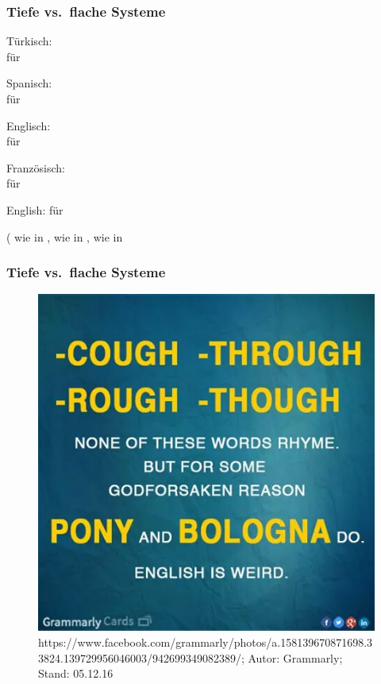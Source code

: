 \begin{frame}
\frametitle{Tiefe vs.\ flache Systeme}


	\ea Türkisch: \\
	 für \textipa{[dYkkan]}
	
	\ex Spanisch: \\
	 für \textipa{[negoTio]}
	
	\ex Englisch: \\
	 für \textipa{[bIzn@z]}
	
	\ex Französisch: \\
	 für \textipa{[butik]}
	\z 
	
\pause	
	
	\ea English:  für  

\pause  
	
	( wie in ,  wie in ,  wie in 
	\z 

\end{frame}


\begin{frame}
\frametitle{Tiefe vs.\ flache Systeme}


\begin{figure}
\centering
	\includegraphics[scale=.3]{material/04GraphEnglischPGK}
	\caption[EnglischPGK]{https://www.facebook.com/grammarly/photos/a.158139670871698.33824.139729956046003/942699349082389/; Autor: Grammarly; Stand: 05.12.16}
\end{figure}

\end{frame}


